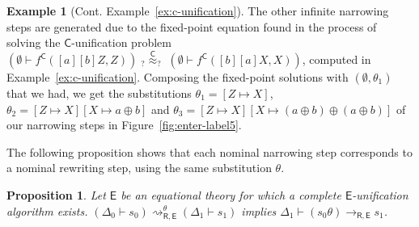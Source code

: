 \documentclass[11pt,a4paper]{amsart}
\newcommand{\daniele}[1]{\textcolor{cyan}{#1}}
\newcommand{\dani}[1]{\textcolor{orange}{#1}}
\newcommand{\theory}[1]{\ensuremath{\mathsf{#1}}}
\theoremstyle{plain}
\newtheorem{proposition}[theorem]{Proposition}
\theoremstyle{definition}
\newtheorem{example}{Example}[section]
\theoremstyle{remark}
\begin{document}
\begin{example}[Cont. Example~\ref{ex:c-unification}]
The other infinite narrowing steps are generated due to the fixed-point equation found in the process of solving the \theory{C}-unification problem 
$(\emptyset\vdash f^\theory{C}([a][b]Z,Z)) \; _?{\overset{\theory{C}}{\approx}}_? \; (\emptyset\vdash  f^\theory{C}([b][a]X,X))$, computed in Example~\ref{ex:c-unification}.
Composing the fixed-point solutions with $(\emptyset, \theta_1)$ that we had, we get the substitutions $\theta_1 = [Z\mapsto X]$, $\theta_2 = [Z\mapsto X][X\mapsto a \oplus b]$ and $\theta_3 = [Z\mapsto X][X\mapsto (a \oplus b)\oplus(a \oplus b)]$ of our narrowing steps in Figure~\ref{fig:enter-label5}.
 
\end{example}










 
 The following proposition shows that each nominal narrowing step corresponds to a nominal rewriting step, using the same substitution $\theta$.


\begin{proposition}\label{prop:narrow-to-rewriting}
Let \theory{E} be an equational theory for which a complete \theory{E}-unification algorithm exists. $(\Delta_0\vdash s_0) \rightsquigarrow_{\theory{R,E}}^{\theta} (\Delta_1 \vdash s_1) $ implies $\Delta_1\vdash (s_0 \theta ) \rightarrow_{\theory{R,E}}  s_1 $.
\end{proposition}
\end{document}

